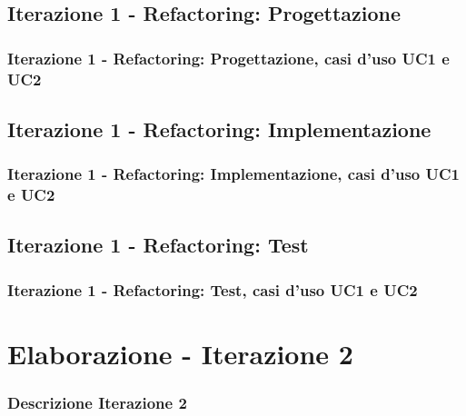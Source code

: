 \documentclass[t]{beamer} %
\begin{document}
\subsection{Iterazione 1 - Refactoring: Progettazione}
\begin{frame}
  \frametitle{Iterazione 1 - Refactoring: Progettazione, casi d'uso UC1 e UC2}
\end{frame}

\subsection{Iterazione 1 - Refactoring: Implementazione}
\begin{frame}
  \frametitle{Iterazione 1 - Refactoring: Implementazione, casi d'uso UC1 e UC2}
\end{frame}

\subsection{Iterazione 1 - Refactoring: Test}
\begin{frame}
  \frametitle{Iterazione 1 - Refactoring: Test, casi d'uso UC1 e UC2}
\end{frame}

\section{Elaborazione - Iterazione 2}
\begin{frame}
  \frametitle{Descrizione Iterazione 2}
\end{frame}
\end{document}
